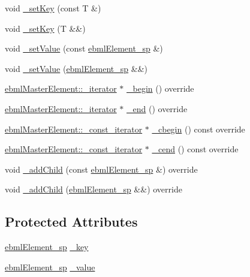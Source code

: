 \begin{DoxyCompactItemize}
void \mbox{\hyperlink{classebml_1_1ebmlPair_ad8a103b58e64c0ae4eb55a4233d41615}{\+\_\+set\+Key}} (const T \&)
\item 
void \mbox{\hyperlink{classebml_1_1ebmlPair_a4eca03083020380229928f80b0226d1b}{\+\_\+set\+Key}} (T \&\&)
\item 
void \mbox{\hyperlink{classebml_1_1ebmlPair_a21a1c612d4032005000b3b4c082b0aa5}{\+\_\+set\+Value}} (const \mbox{\hyperlink{namespaceebml_adad533b7705a16bb360fe56380c5e7be}{ebml\+Element\+\_\+sp}} \&)
\item 
void \mbox{\hyperlink{classebml_1_1ebmlPair_abac0f95caefcfd7b0028cd1f6b70e96d}{\+\_\+set\+Value}} (\mbox{\hyperlink{namespaceebml_adad533b7705a16bb360fe56380c5e7be}{ebml\+Element\+\_\+sp}} \&\&)
\item 
\mbox{\hyperlink{classebml_1_1ebmlMasterElement_1_1__iterator}{ebml\+Master\+Element\+::\+\_\+iterator}} $\ast$ \mbox{\hyperlink{classebml_1_1ebmlPair_a1bd75b88b0b88d39a48283a2d8e9be4e}{\+\_\+begin}} () override
\item 
\mbox{\hyperlink{classebml_1_1ebmlMasterElement_1_1__iterator}{ebml\+Master\+Element\+::\+\_\+iterator}} $\ast$ \mbox{\hyperlink{classebml_1_1ebmlPair_aa9885eed27f8a81efe246b5a6755186b}{\+\_\+end}} () override
\item 
\mbox{\hyperlink{classebml_1_1ebmlMasterElement_1_1__const__iterator}{ebml\+Master\+Element\+::\+\_\+const\+\_\+iterator}} $\ast$ \mbox{\hyperlink{classebml_1_1ebmlPair_aa52de57679fd688de58ffebb225db68e}{\+\_\+cbegin}} () const override
\item 
\mbox{\hyperlink{classebml_1_1ebmlMasterElement_1_1__const__iterator}{ebml\+Master\+Element\+::\+\_\+const\+\_\+iterator}} $\ast$ \mbox{\hyperlink{classebml_1_1ebmlPair_a555af18316fef979695572e2d0f9a784}{\+\_\+cend}} () const override
\item 
void \mbox{\hyperlink{classebml_1_1ebmlPair_affcffc81a14642fbc375d2fcdbfa29f3}{\+\_\+add\+Child}} (const \mbox{\hyperlink{namespaceebml_adad533b7705a16bb360fe56380c5e7be}{ebml\+Element\+\_\+sp}} \&) override
\item 
void \mbox{\hyperlink{classebml_1_1ebmlPair_a3baa6b65958e830a0fb9e0d80f6497b5}{\+\_\+add\+Child}} (\mbox{\hyperlink{namespaceebml_adad533b7705a16bb360fe56380c5e7be}{ebml\+Element\+\_\+sp}} \&\&) override
\end{DoxyCompactItemize}
\subsection*{Protected Attributes}
\begin{DoxyCompactItemize}
\item 
\mbox{\hyperlink{namespaceebml_adad533b7705a16bb360fe56380c5e7be}{ebml\+Element\+\_\+sp}} \mbox{\hyperlink{classebml_1_1ebmlPair_a249e518ff62935795def352767e358c9}{\+\_\+key}}
\item 
\mbox{\hyperlink{namespaceebml_adad533b7705a16bb360fe56380c5e7be}{ebml\+Element\+\_\+sp}} \mbox{\hyperlink{classebml_1_1ebmlPair_af34944c081ca98c445403101d5b9cb2f}{\+\_\+value}}
\end{DoxyCompactItemize}
